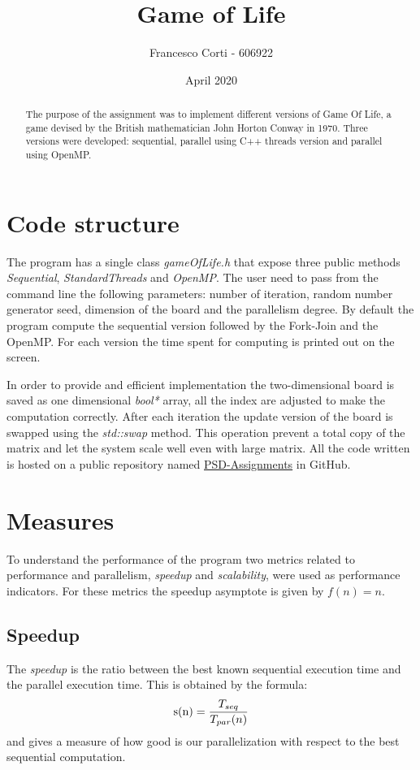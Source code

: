 \documentclass[a4paper,10pt]{article}
\title{Game of Life}
\author{Francesco Corti - 606922}
\date{April 2020}
\begin{document}
		\maketitle
		\begin{abstract}
			The purpose of the assignment was to implement different versions of Game Of Life, a game devised by the British mathematician John Horton Conway in 1970.
			Three versions were developed: sequential, parallel using C++ threads version and parallel using OpenMP. 
		\end{abstract}
\vspace{0.3cm}

\section{Code structure}
The program has a single class \textit{gameOfLife.h} that expose three public methods \textit{Sequential}, \textit{StandardThreads} and \textit{OpenMP}. The user need to pass from the command line the following parameters: number of iteration, random number generator seed, dimension of the board and the parallelism degree. By default the program compute the sequential version followed by the Fork-Join and the OpenMP. For each version the time spent for computing is printed out on the screen.

In order to provide and efficient implementation the two-dimensional board is saved as one dimensional \textit{bool*} array, all the index are adjusted to make the computation correctly. After each iteration the update version of the board is swapped using the \textit{std::swap} method. This operation prevent a total copy of the matrix and let the system scale well even with large matrix. All the code written is hosted on a public repository named \href{https://github.com/FraCorti/PSD-Assignments}{PSD-Assignments} in GitHub.

\section{Measures}
To understand the performance of the program two metrics related to performance and parallelism, \textit{speedup} and \textit{scalability}, were used as performance indicators. For these metrics the speedup asymptote is given by $f(n) = n $. 
\subsection{Speedup}
The \textit{speedup} is the ratio between the best known sequential execution time and the parallel execution time. This is obtained by the formula:
\begin{equation}
\textnormal{s(n)} = \frac{T_{seq}}{T_{par}(n)}
\end{equation}
 and gives a measure of how good is our parallelization with respect to the best sequential computation.
\end{document}
